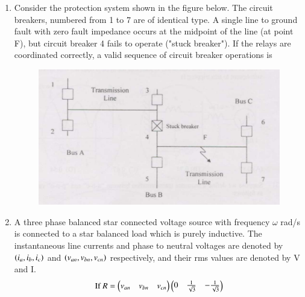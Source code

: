\documentclass[journal,,12pt,onecolumn]{IEEEtran}
\theoremstyle{remark}
\begin{document}
\begin{enumerate}
\begin{enumerate}
\end{enumerate}
\bigskip
\item Consider the protection system shown in the figure below. The circuit breakers, numbered from 1 to 7 are of identical type. A single line to ground fault with zero fault impedance occurs at the midpoint of the line (at point F), but circuit breaker 4 fails to operate ("stuck breaker"). If the relays are coordinated correctly, a valid sequence of circuit breaker operations is
\begin{figure}[H]
   \centering
   \includegraphics[width=0.7\linewidth]{figs/fig_6.png}
   \label{stemplot}
\end{figure}
\begin{enumerate}
\end{enumerate}
\bigskip
\item A three phase balanced star connected voltage source with frequency $\omega$ rad/s is connected to a star balanced load which is purely inductive. The instantaneous line currents and phase to neutral voltages are denoted by $\left(i_a,i_b,i_c\right)$ and $\left(v_{an},v_{bn},v_{cn}\right)$ respectively, and their rms values are denoted by V and I.
\begin{align*}
    \text{If }R=\begin{pmatrix}v_{an}&v_{bn}&v_{cn}\end{pmatrix}\begin{pmatrix}0&\frac{1}{\sqrt{3}}&-\frac{1}{\sqrt{3}}\\
\end{pmatrix}
\end{align*}
\end{enumerate}
\end{document}
